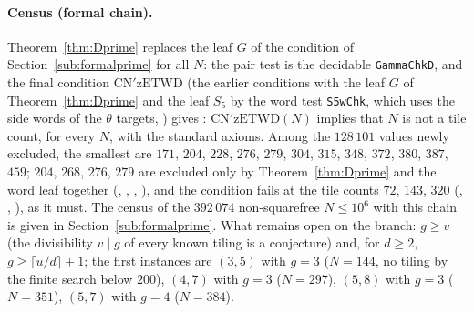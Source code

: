 \documentclass[11pt,reqno]{amsart}
\theoremstyle{plain}
\theoremstyle{definition}
\begin{document}
\paragraph{Census (formal chain).}
Theorem~\ref{thm:Dprime} replaces the leaf $G$ of the condition of Section~\ref{sub:formalprime} for all $N$: the pair test is
the decidable \texttt{GammaChkD}, and the final condition $\mathrm{CN'zETWD}$ (the earlier conditions with the leaf $G$ of Theorem~\ref{thm:Dprime}
and the leaf $S_5$ by the word test \texttt{S5wChk}, which uses the side words of the $\theta$ targets, ) gives
: $\mathrm{CN'zETWD}(N)$ implies that $N$ is not a tile count, for every $N$, with the standard axioms. Among the
$128\,101$ values newly excluded, the smallest are $171$, $204$, $228$, $276$, $279$, $304$, $315$, $348$, $372$, $380$, $387$, $459$; $204$, $268$, $276$, $279$ are
excluded only by Theorem~\ref{thm:Dprime} and the word leaf together (, , , ), and the
condition fails at the tile counts $72$, $143$, $320$ (, , ), as it must.
The census of the $392\,074$ non-squarefree $N\le10^6$ with this chain is given in Section~\ref{sub:formalprime}.
What remains open on the branch: $g\ge v$ (the divisibility $v\mid g$ of every known tiling is a conjecture) and, for $d\ge2$, $g\ge\lceil u/d\rceil+1$; the first instances are $(3,5)$ with $g=3$ ($N=144$, no tiling by the finite search below $200$), $(4,7)$ with $g=3$ ($N=297$), $(5,8)$ with $g=3$ ($N=351$), $(5,7)$ with $g=4$ ($N=384$).
\end{document}
